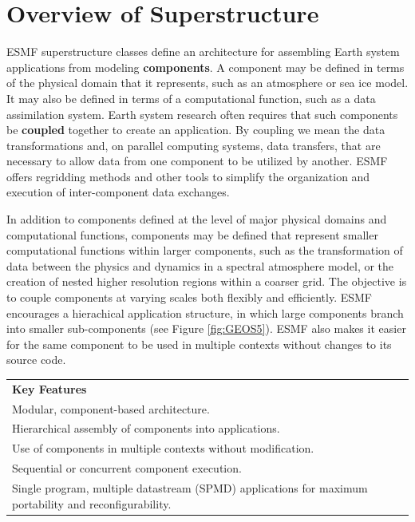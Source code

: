 %

\section{Overview of Superstructure}

ESMF superstructure classes define an architecture for assembling
Earth system applications from modeling {\bf components}.  A component
may be defined in terms of the physical domain that it represents,
such as an atmosphere or sea ice model.  It may also be defined in terms
of a computational function, such as a data assimilation system.
Earth system research often requires that such components be {\bf coupled} 
together to create an application.  By coupling we mean the data 
transformations and, on parallel computing systems, data transfers, 
that are necessary to allow data from one component to be utilized by 
another.  ESMF offers regridding methods and other tools to simplify 
the organization and execution of inter-component data exchanges.  

In addition to components defined at the level of major physical 
domains and computational functions, components may be defined that 
represent smaller computational functions within larger components, 
such as the transformation of data between the physics and dynamics 
in a spectral atmosphere model, 
or the creation of nested higher resolution regions 
within a coarser grid.  The objective is to couple components at varying 
scales both flexibly and efficiently.  ESMF encourages a hierachical
application structure, in which large components branch into 
smaller sub-components (see Figure \ref{fig:GEOS5}).  ESMF also makes 
it easier for the same component to be used in multiple contexts 
without changes to its source code.

\begin{center}  
\begin{tabular}{|p{6in}|}
\hline
\vspace{.01in}
{\bf Key Features} \\[.01in]
Modular, component-based architecture. \\
Hierarchical assembly of components into applications.\\
Use of components in multiple contexts without modification.\\
Sequential or concurrent component execution.\\
Single program, multiple datastream (SPMD) applications for 
maximum portability and reconfigurability.\\[.03in] \hline
\end{tabular}
\end{center}

